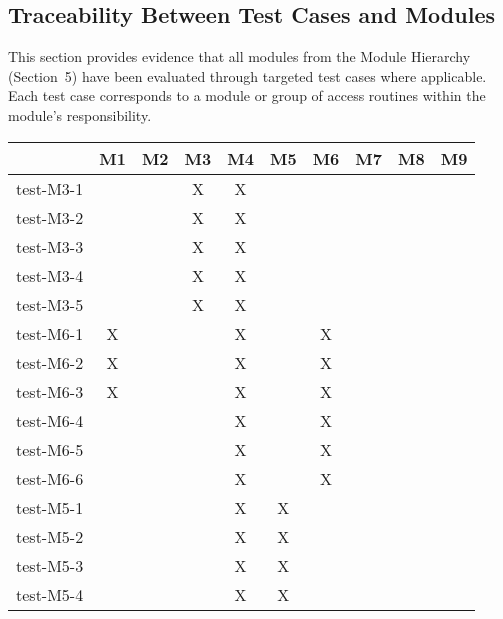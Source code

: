 \documentclass[12pt, titlepage]{article}
\begin{document}
\subsection{Traceability Between Test Cases and Modules}
\label{sec:trace-test-modules}

This section provides evidence that all modules from the Module Hierarchy (Section~5) have been evaluated through targeted test cases where applicable. Each test case corresponds to a module or group of access routines within the module's responsibility.

\begin{table}[h!]
  \centering
  \begin{tabular}{|c|c|c|c|c|c|c|c|c|c|}
  \hline
   & M1 & M2 & M3 & M4 & M5 & M6 & M7 & M8 & M9 \\
  \hline
  test-M3-1   &     &     & X   &  X   &     &     &     &     &     \\ \hline
  test-M3-2   &     &     & X   &  X   &     &     &     &     &     \\ \hline
  test-M3-3   &     &     & X   &  X   &     &     &     &     &     \\ \hline
  test-M3-4   &     &     & X   &  X   &     &     &     &     &     \\ \hline
  test-M3-5   &     &     & X   &  X   &     &     &     &     &     \\ \hline
  test-M6-1   &  X   &     &     &  X   &     & X   &     &     &     \\ \hline
  test-M6-2   &  X   &     &     &  X   &     & X   &     &     &     \\ \hline
  test-M6-3   &  X   &     &     &  X   &     & X   &     &     &     \\ \hline
  test-M6-4   &     &     &     &  X   &     & X   &     &     &     \\ \hline
  test-M6-5   &     &     &     &  X   &     & X   &     &     &     \\ \hline
  test-M6-6   &     &     &     &  X   &     & X   &     &     &     \\ \hline
  test-M5-1   &     &     &     &  X   & X   &     &     &     &     \\ \hline
  test-M5-2   &     &     &     &  X   & X   &     &     &     &     \\ \hline
  test-M5-3   &     &     &     &  X   & X   &     &     &     &     \\ \hline
  test-M5-4   &     &     &     &  X   & X   &     &     &     &     \\ \hline

\end{tabular}
\end{table}
\end{document}
